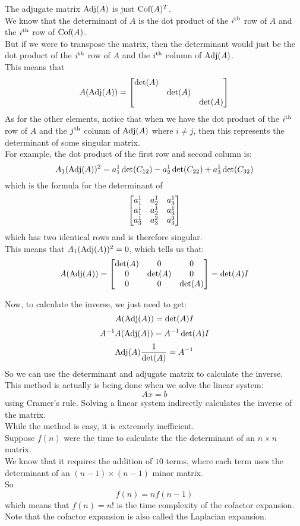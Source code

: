 \documentclass[12pt]{article}
\begin{document}
The adjugate matrix $\text{Adj}(A)$
is just $\text{Cof}(A)^T$. \\
We know that the determinant of $A$
is the dot product of the $i^{\text{th}}$
row of $A$ and the $i^{\text{th}}$ row of $\text{Cof}(A)$. \\
But if we were to transpose the matrix,
then the determinant would just be the dot
product of the $i^{\text{th}}$ row of $A$
and the $i^{\text{th}}$ column of $\text{Adj}(A)$. \\
This means that
\[ A (\text{Adj}(A)) = \begin{bmatrix} \det(A) &  &  \\  & \det(A) &  \\  &  & \det(A) \end{bmatrix} \]
As for the other elements,
notice that when we have the dot product of the
$i^{\text{th}}$ row of $A$
and the $j^{\text{th}}$ column of $\text{Adj}(A)$
where $i \neq j$,
then this represents the determinant of some
singular matrix. \\
For example, the dot product of the first row
and second column is:
\[ A_1(\text{Adj}(A))^2 =
a_1^1 \det(C_{12})
- a_2^1 \det(C_{22}) + a_3^1 \det(C_{32}) \]
which is the formula for the determinant of
\[ \begin{bmatrix} a_1^1 & a_2^1 & a_3^1 \\ a_1^1 & a_2^1 & a_3^1 \\ a_3^1 & a_3^2 & a_3^3 \end{bmatrix} \]
which has two identical rows and is therefore
singular. \\
This means that $A_1(\text{Adj}(A))^2 = 0$,
which tells us that:
\[ A (\text{Adj}(A)) = \begin{bmatrix} \det(A) & 0 & 0 \\ 0 & \det(A) & 0 \\ 0 & 0 & \det(A) \end{bmatrix} 
= \det(A)I \]

Now, to calculate the inverse, we just need
to get:
\[ A (\text{Adj}(A)) = \det(A)I  \]
\[ A^{-1} A (\text{Adj}(A)) = A^{-1} \det(A)I \]
\[ \text{Adj}(A) \dfrac{1}{\det(A)} = A^{-1} \]
So we can use the determinant and adjugate matrix
to calculate the inverse. \\
This method is actually
is being done when we solve the linear
system:
\[ Ax = b \]
using Cramer's rule.
Solving a linear system indirectly
calculates the inverse of the matrix. \\

While the method is easy, it is extremely
inefficient. \\
Suppose $f(n)$ were the time to calculate the
the determinant of an $n \times n$ matrix. \\
We know that it requires the addition of $10$
terms, where each term uses the determinant
of an $(n-1) \times (n-1)$ minor matrix. \\
So
\[ f(n) = nf(n-1) \]
which means that $f(n) = n!$ is the time
complexity of the cofactor expansion. \\

Note that the cofactor expansion is also
called the Laplacian expansion. \\
\end{document}
